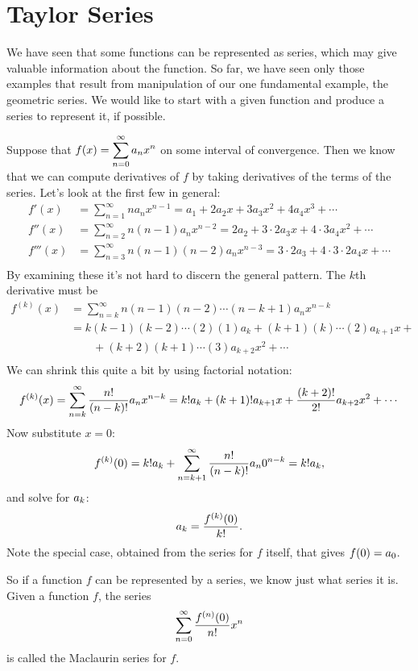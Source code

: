 \chapter{Taylor Series}{}{}

\nobreak
We have seen that some functions can be represented as series, which
may give valuable information about the function. So far, we have seen
only those examples that result from manipulation of our one
fundamental example, the geometric series. We would like to start with
a given function and produce a series to represent it, if possible.

Suppose that $\displaystyle f(x)=\sum_{n=0}^\infty a_nx^n$ on some interval of
convergence. Then we know that we can compute derivatives of $f$ by
taking derivatives of the terms of the series. Let's look at the first
few in general:
\begin{align*}
  f'(x)&=\sum_{n=1}^\infty n a_n x^{n-1}=a_1 + 2a_2x+3a_3x^2+4a_4x^3+\cdots \\
  f''(x)&=\sum_{n=2}^\infty n(n-1) a_n x^{n-2}=2a_2+3\cdot2a_3x
    +4\cdot3a_4x^2+\cdots \\
  f'''(x)&=\sum_{n=3}^\infty n(n-1)(n-2) a_n x^{n-3}=3\cdot2a_3
    +4\cdot3\cdot2a_4x+\cdots \\
\end{align*}
By examining these it's not hard to discern the general pattern. The
$k$th derivative must be
\begin{align*}
  f^{(k)}(x)&=\sum_{n=k}^\infty n(n-1)(n-2)\cdots(n-k+1)a_nx^{n-k} \\
  &=k(k-1)(k-2)\cdots(2)(1)a_k+(k+1)(k)\cdots(2)a_{k+1}x+{} \\
  &\qquad {}+(k+2)(k+1)\cdots(3)a_{k+2}x^2+\cdots \\
\end{align*}
We can shrink this quite a bit by using factorial notation:
$$
  f^{(k)}(x)=\sum_{n=k}^\infty {n!\over (n-k)!}a_nx^{n-k}=
  k!a_k+(k+1)!a_{k+1}x+{(k+2)!\over 2!}a_{k+2}x^2+\cdots
$$
Now substitute $x=0$:
$$f^{(k)}(0)=k!a_k+\sum_{n=k+1}^\infty {n!\over (n-k)!}a_n0^{n-k}=k!a_k,$$
and solve for $\displaystyle a_k$:
$$a_k={f^{(k)}(0)\over k!}.$$
Note the special case, obtained from the series for $f$ itself, that
gives $\displaystyle f(0)=a_0$.

So if a function $f$ can be represented by a series, we know just what
series it is. Given a function $f$, the series
$$\sum_{n=0}^\infty {f^{(n)}(0)\over n!}x^n$$
is called the {\dfont Maclaurin 
series\/} for $f$.

